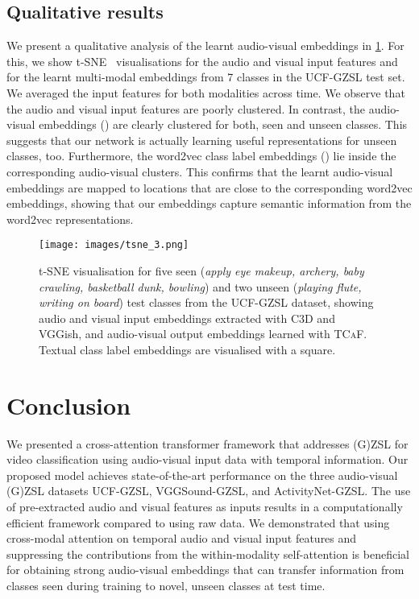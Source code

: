 \documentclass[runningheads]{llncs}
\newcommand{\modelName}{\textsc{TCaF}\xspace}
\newcommand{\activity}{{ActivityNet-GZSL}\xspace}
\newcommand{\ucf}{{UCF-GZSL}\xspace}
\newcommand{\vgg}{{VGGSound-GZSL}\xspace}
\begin{document}
\subsection{Qualitative results}\label{sec:qualitative}
We present a qualitative analysis of the learnt audio-visual embeddings in \cref{fig:qualitative_results_ucf}. For this, we show t-SNE~\cite{van2008visualizing} visualisations for the audio and visual input features and for the learnt multi-modal embeddings from 7 classes in the \ucf test set. We averaged the input features for both modalities across time. We observe that the audio and visual input features are poorly clustered.
In contrast, the audio-visual embeddings () are clearly clustered for both, seen and unseen classes. This suggests that our network is actually learning useful representations for unseen classes, too.
Furthermore, the word2vec class label embeddings () lie inside the corresponding audio-visual clusters. This confirms that the learnt audio-visual embeddings are mapped to locations that are close to the corresponding word2vec embeddings, showing that our embeddings capture semantic information from the word2vec representations.


 \begin{figure}[t]
     \centering
\texttt{[image: images/tsne\_3.png]}
\caption{t-SNE visualisation for five seen (\textit{apply eye makeup, archery, baby crawling, basketball dunk, bowling}) and two unseen (\textit{playing flute, writing on board}) test classes from the \ucf dataset, showing audio and visual input embeddings extracted with C3D and VGGish, and audio-visual output embeddings learned with \modelName. Textual class label embeddings are visualised with a square.
        }
        \label{fig:qualitative_results_ucf}
\end{figure}

\section{Conclusion}
We presented a cross-attention transformer framework that addresses (G)ZSL for video classification using audio-visual input data with temporal information. Our proposed model achieves state-of-the-art performance on the three audio-visual (G)ZSL datasets \ucf, \vgg, and \activity. The use of pre-extracted audio and visual features as inputs results in a computationally efficient framework compared to using raw data. We demonstrated that using cross-modal attention on temporal audio and visual input features and suppressing the contributions from the within-modality self-attention is beneficial for obtaining strong audio-visual embeddings that can transfer information from classes seen during training to novel, unseen classes at test time. 
\end{document}
